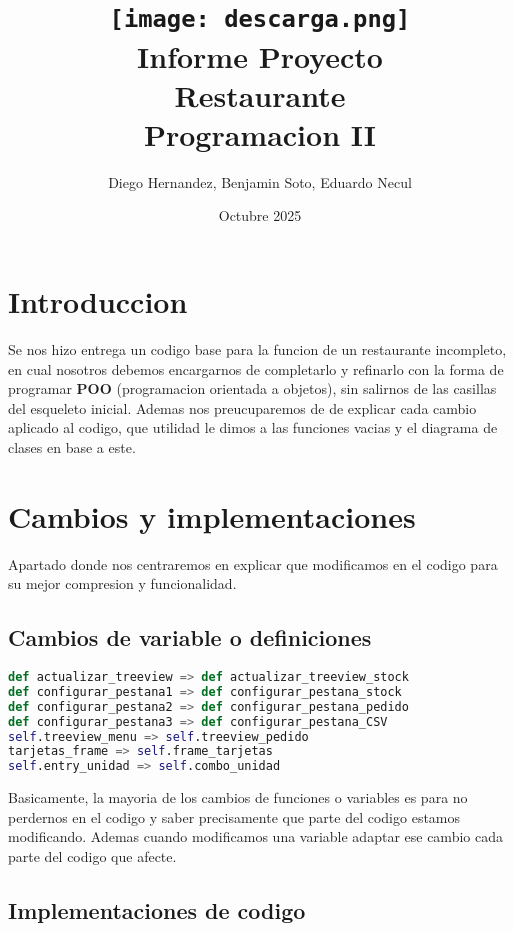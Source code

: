 \documentclass[a4paper,12pt]{article}
\title {\texttt{[image: descarga.png]}\\[2ex]{\textbf{Informe Proyecto\\ Restaurante}\\[1.5ex] Programacion II\\[20ex]}}
\author{Diego Hernandez, Benjamin Soto, Eduardo Necul}
\date{Octubre 2025}
\begin{document}
\maketitle
\newpage

\section{Introduccion}

Se nos hizo entrega un codigo base para la funcion de un restaurante incompleto, en cual nosotros debemos encargarnos de completarlo y refinarlo con la forma de programar \textbf{POO} (programacion orientada a objetos), sin salirnos de las casillas del esqueleto inicial. Ademas nos preucuparemos de de explicar cada cambio aplicado al codigo, que utilidad le dimos a las funciones vacias y el diagrama de clases en base a este.

\section{Cambios y implementaciones}

Apartado donde nos centraremos en explicar que modificamos en el codigo para su mejor compresion y funcionalidad.

\subsection{Cambios de variable o definiciones}

\begin{lstlisting}[language=Python, caption={Cambios de definiciones o variables}, frame=single]
def actualizar_treeview => def actualizar_treeview_stock
def configurar_pestana1 => def configurar_pestana_stock
def configurar_pestana2 => def configurar_pestana_pedido
def configurar_pestana3 => def configurar_pestana_CSV
self.treeview_menu => self.treeview_pedido
tarjetas_frame => self.frame_tarjetas
self.entry_unidad => self.combo_unidad
\end{lstlisting}

Basicamente, la mayoria de los cambios de funciones o variables es para no perdernos en el codigo y saber precisamente que parte del codigo estamos modificando. Ademas cuando modificamos una variable adaptar ese cambio cada parte del codigo que afecte.

\subsection{Implementaciones de codigo}
\end{document}
